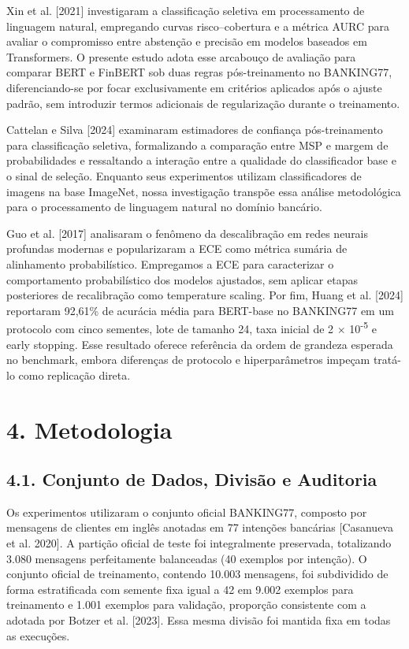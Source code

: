 \documentclass[12pt,a4paper]{article}
\begin{document}
Xin et al. [2021] investigaram a classificação seletiva em processamento de linguagem natural, empregando curvas risco–cobertura e a métrica AURC para avaliar o compromisso entre abstenção e precisão em modelos baseados em Transformers. O presente estudo adota esse arcabouço de avaliação para comparar BERT e FinBERT sob duas regras pós-treinamento no BANKING77, diferenciando-se por focar exclusivamente em critérios aplicados após o ajuste padrão, sem introduzir termos adicionais de regularização durante o treinamento.

Cattelan e Silva [2024] examinaram estimadores de confiança pós-treinamento para classificação seletiva, formalizando a comparação entre MSP e margem de probabilidades e ressaltando a interação entre a qualidade do classificador base e o sinal de seleção. Enquanto seus experimentos utilizam classificadores de imagens na base ImageNet, nossa investigação transpõe essa análise metodológica para o processamento de linguagem natural no domínio bancário.

Guo et al. [2017] analisaram o fenômeno da descalibração em redes neurais profundas modernas e popularizaram a ECE como métrica sumária de alinhamento probabilístico. Empregamos a ECE para caracterizar o comportamento probabilístico dos modelos ajustados, sem aplicar etapas posteriores de recalibração como temperature scaling. Por fim, Huang et al. [2024] reportaram 92,61\% de acurácia média para BERT-base no BANKING77 em um protocolo com cinco sementes, lote de tamanho 24, taxa inicial de 2 \ensuremath{\times} 10\textsuperscript{-}\textsuperscript{5} e early stopping. Esse resultado oferece referência da ordem de grandeza esperada no benchmark, embora diferenças de protocolo e hiperparâmetros impeçam tratá-lo como replicação direta.

\section*{\textbf{4. Metodologia}}

\subsection*{\textbf{4.1. Conjunto de Dados, Divisão e Auditoria}}

Os experimentos utilizaram o conjunto oficial BANKING77, composto por mensagens de clientes em inglês anotadas em 77 intenções bancárias [Casanueva et al. 2020]. A partição oficial de teste foi integralmente preservada, totalizando 3.080 mensagens perfeitamente balanceadas (40 exemplos por intenção). O conjunto oficial de treinamento, contendo 10.003 mensagens, foi subdividido de forma estratificada com semente fixa igual a 42 em 9.002 exemplos para treinamento e 1.001 exemplos para validação, proporção consistente com a adotada por Botzer et al. [2023]. Essa mesma divisão foi mantida fixa em todas as execuções.
\end{document}

